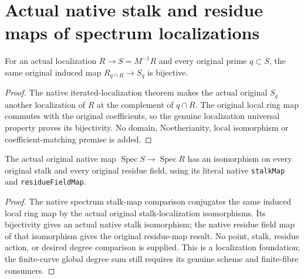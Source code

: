 \section{Actual native stalk and residue maps of spectrum localizations}

\begin{theorem}
\label{thm:fc-spec-localization-local-ring-maps}
\leanok
{}
For an actual localization $R\to S=M^{-1}R$ and every original prime
$q\subset S$, the same original induced map
$R_{q\cap R}\to S_q$ is bijective.
\end{theorem}
\begin{proof}
The native iterated-localization theorem makes the actual original $S_q$
another localization of $R$ at the complement of $q\cap R$.  The original
local ring map commutes with the original coefficients, so the genuine
localization universal property proves its bijectivity.  No domain,
Noetherianity, local isomorphism or coefficient-matching premise is added.
\end{proof}

\begin{theorem}
\label{thm:fc-spec-localization-native-stalk-residue}
\leanok
{}
The actual original native map $\operatorname{Spec}S\to\operatorname{Spec}R$
has an isomorphism on every original stalk and every original residue field,
using its literal native \texttt{stalkMap} and \texttt{residueFieldMap}.
\end{theorem}
\begin{proof}
The native spectrum stalk-map comparison conjugates the same induced local
ring map by the actual original stalk-localization isomorphisms.  Its
bijectivity gives an actual native stalk isomorphism; the native residue
field map of that isomorphism gives the original residue-map result.
No point, stalk, residue action, or desired degree comparison is supplied.
This is a localization foundation; the finite-curve global degree sum still
requires its genuine scheme and finite-fibre consumers.
\end{proof}
